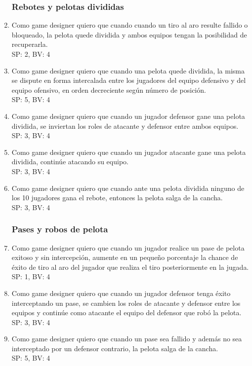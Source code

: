 \documentclass[a4paper, 10pt, twoside]{article}
\begin{document}
\begin{enumerate}
\subsubsection{Rebotes y pelotas divididas}
    \item Como game designer quiero que cuando cuando un tiro al aro resulte fallido o bloqueado, la pelota quede dividida y ambos equipos tengan la posibilidad de recuperarla.
    \\SP: 2, BV: 4
    \item Como game designer quiero que cuando una pelota quede dividida, la misma se dispute en forma intercalada entre los jugadores del equipo defensivo y del equipo ofensivo, en orden decreciente seg\'un n\'umero de posici\'on.
    \\SP: 5, BV: 4
    \item Como game designer quiero que cuando un jugador defensor gane una pelota dividida, se inviertan los roles de atacante y defensor entre ambos equipos.
    \\SP: 3, BV: 4
    \item Como game designer quiero que cuando un jugador atacante gane una pelota dividida, contin\'ue atacando su equipo.
    \\SP: 3, BV: 4
    \item Como game designer quiero que cuando ante una pelota dividida ninguno de los 10 jugadores gana el rebote, entonces la pelota salga de la cancha.
    \\SP: 3, BV: 4
    \subsubsection{Pases y robos de pelota}
    \item Como game designer quiero que cuando un jugador realice un pase de pelota exitoso y sin intercepci\'on, aumente en un peque\~no porcentaje la chance de \'exito de tiro al aro del jugador que realiza el tiro posteriormente en la jugada.
    \\SP: 1, BV: 4
    \item Como game designer quiero que cuando un jugador defensor tenga \'exito interceptando un pase, se cambien los roles de atacante y defensor entre los equipos y contin\'ue como atacante el equipo del defensor que rob\'o la pelota.
    \\SP: 3, BV: 4
    \item Como game designer quiero que cuando un pase sea fallido y adem\'as no sea interceptado por un defensor contrario, la pelota salga de la cancha.
    \\SP: 5, BV: 4

\end{enumerate}
\end{document}
